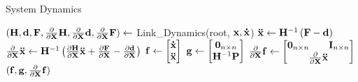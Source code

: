 \begin{algorithm}[H]
	\caption{System Dynamics}\label{alg:sys_dyn}
	\begin{algorithmic}
	\State $(\H, \d,\F, \partialX{}\H, \partialX{}\d,\partialX{}\F) \gets $ Link\_Dynamics(root, $\x, \dotx$) 
	\State $\ddotx \gets \H^{-1}\left (\F - \d \right )$
	\State $\partialX{} \ddotx \gets \H^{-1}\left (\partialX{\H} \ddotx + \partialX{\F} - \partialX{\d} \right )$
	\State $\f \gets \begin{bmatrix} \dotx \\ \ddotx \end{bmatrix}$
	\State $\g \gets \begin{bmatrix} \ZERO_{n \times n} \\ \H^{-1}\P \end{bmatrix}$
	\State $\partialX{}\f \gets \begin{bmatrix}
    \ZERO_{n \times n}  ~~~~~~ \EYE_{n \times n}  \\
    \partialX{} \ddotx 
    \end{bmatrix}$
    \State \Return $(\f, \g, \partialX{}\f)$ 
	\end{algorithmic}
\end{algorithm}
